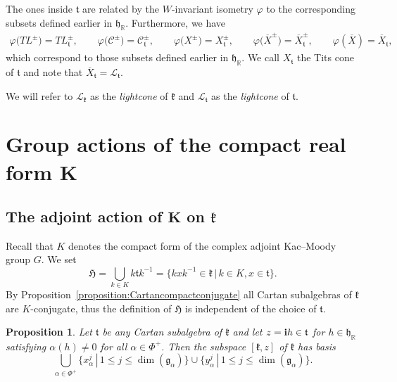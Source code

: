 \documentclass[pdftex]{sigma}
\numberwithin{equation}{section}
\newtheorem{Proposition}[Theorem]{Proposition}
 { \theoremstyle{definition}
\newtheorem{Definition}[Theorem]{Definition}
\newtheorem{Remark}[Theorem]{Remark} }
\def\R{\mathbb{R}}
\def\bi{{\bf i}}
\def\cC{\mathcal C}
\def\cL{\mathcal L}
\def\g{\mathfrak{g}}
\def\h{\mathfrak{h}}
\def\fH{\mathfrak{H}}
\def\k{\mathfrak{k}}
\def\fk{\mathfrak{k}}
\def\ft{\mathfrak{t}}
\begin{document}
The ones inside $\ft$ are related by the $W$-invariant isometry $\varphi$ to the corresponding subsets defined earlier in $\h_\R$.
Furthermore, we have
\begin{gather*} \varphi\big(TL^\pm\big) = TL_\ft^\pm,\qquad\! \varphi\big(\cC^\pm\big) = \cC_\ft^\pm,\qquad\! \varphi\big(X^\pm\big) = X_\ft^\pm,\qquad\!
\varphi\big(\overline{X}^\pm\big) = \overline{X}_\ft^\pm,\qquad\! \varphi(\overline{X}) = \overline{X}_\ft,
\end{gather*}
which correspond to those subsets defined earlier in $\h_\R$. We call $X_{\ft}$ the Tits cone of $\ft$ and note that $\overline{X}_\ft = \cL_{\ft}$.

\begin{Remark}\label{remark:lightconecompactform}
We will refer to $\cL_{\k}$ as the {\em lightcone} of $\k$ and $\cL_{\ft}$ as the {\em lightcone} of $\ft$.
\end{Remark}

\section[Group actions of the compact real form $K$]{Group actions of the compact real form $\boldsymbol{K}$}

\subsection[The adjoint action of $K$ on $\k$]{The adjoint action of $\boldsymbol{K}$ on $\boldsymbol{\k}$}\label{subsection:globalstructureAdjointaction}

Recall that $K$ denotes the compact form of the complex adjoint Kac--Moody group $G$. We set
\[\fH = \bigcup_{k\in K} k \ft k^{-1} = \big\{k x k^{-1}\in \fk \,|\, k\in K, x \in \ft\big\}.\]
By Proposition~\ref{proposition:Cartancompactconjugate} all Cartan subalgebras of $\k$ are $K$-conjugate, thus the definition of $\mathfrak{H}$ is independent of the choice of $\ft$.

\begin{Proposition}\label{proposition:tangentspace}Let $\ft$ be any Cartan subalgebra of $\k$ and let $z = \bi h\in\ft$ for $h\in\h_\R$ satisfying $\alpha(h)\neq 0$ for all $\alpha\in\Phi^+$.
Then the subspace $[\k,z]$ of $\k$ has basis
\[\bigcup_{\alpha\in\Phi^+} \big\{ x_{\alpha}^{j}\, |\, 1\leq j\leq \dim (\g_{\alpha})\big\} \cup
 \big\{ y_{\alpha}^{j} \, |\, 1\leq j\leq \dim (\g_{\alpha}) \big\}.\]
\end{Proposition}
\end{document}
